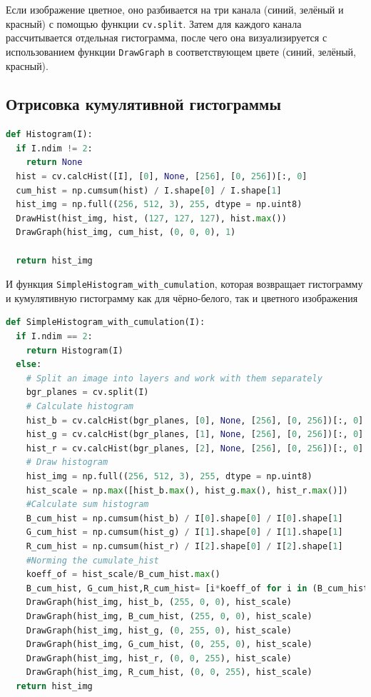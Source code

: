 \documentclass[a4paper,12pt]{article}
\begin{document}
Если изображение цветное, оно разбивается на три канала (синий, зелёный и красный) с помощью функции \texttt{cv.split}. Затем для каждого канала рассчитывается отдельная гистограмма, после чего она визуализируется с использованием функции \texttt{DrawGraph} в соответствующем цвете (синий, зелёный, красный).
\subsection{Отрисовка кумулятивной гистограммы}
\begin{lstlisting}[language = Python, caption = Кумулятивная гистограмма для чб изображения]
def Histogram(I):
  if I.ndim != 2:
    return None
  hist = cv.calcHist([I], [0], None, [256], [0, 256])[:, 0]
  cum_hist = np.cumsum(hist) / I.shape[0] / I.shape[1]
  hist_img = np.full((256, 512, 3), 255, dtype = np.uint8)
  DrawHist(hist_img, hist, (127, 127, 127), hist.max())
  DrawGraph(hist_img, cum_hist, (0, 0, 0), 1)
  
  return hist_img
\end{lstlisting}
И функция \verb|SimpleHistogram_with_cumulation|, которая возвращает гистограмму и кумулятивную гистограмму как для чёрно-белого, так и цветного изображения
\begin{lstlisting}[language = Python, caption = Функция для отрисовки гистограммы и кумулятивной гистограммы для цветного изображения]
def SimpleHistogram_with_cumulation(I):
  if I.ndim == 2:
    return Histogram(I)
  else:
    # Split an image into layers and work with them separately
    bgr_planes = cv.split(I)
    # Calculate histogram
    hist_b = cv.calcHist(bgr_planes, [0], None, [256], [0, 256])[:, 0]
    hist_g = cv.calcHist(bgr_planes, [1], None, [256], [0, 256])[:, 0]
    hist_r = cv.calcHist(bgr_planes, [2], None, [256], [0, 256])[:, 0]
    # Draw histogram
    hist_img = np.full((256, 512, 3), 255, dtype = np.uint8)
    hist_scale = np.max([hist_b.max(), hist_g.max(), hist_r.max()])
    #Calculate sum histogram
    B_cum_hist = np.cumsum(hist_b) / I[0].shape[0] / I[0].shape[1]
    G_cum_hist = np.cumsum(hist_g) / I[1].shape[0] / I[1].shape[1]
    R_cum_hist = np.cumsum(hist_r) / I[2].shape[0] / I[2].shape[1]
    #Norming the cumulate_hist
    koeff_of = hist_scale/B_cum_hist.max()
    B_cum_hist, G_cum_hist,R_cum_hist= [i*koeff_of for i in (B_cum_hist, G_cum_hist,R_cum_hist)]
    DrawGraph(hist_img, hist_b, (255, 0, 0), hist_scale)
    DrawGraph(hist_img, B_cum_hist, (255, 0, 0), hist_scale)
    DrawGraph(hist_img, hist_g, (0, 255, 0), hist_scale)
    DrawGraph(hist_img, G_cum_hist, (0, 255, 0), hist_scale)
    DrawGraph(hist_img, hist_r, (0, 0, 255), hist_scale)
    DrawGraph(hist_img, R_cum_hist, (0, 0, 255), hist_scale)
  return hist_img    
\end{lstlisting}
\end{document}
